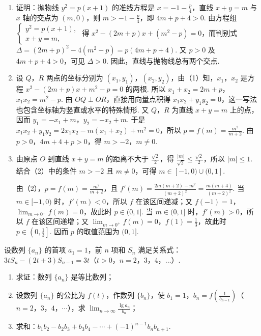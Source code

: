 \begin{solution}

\begin{enumerate}
\item
证明：抛物线 \(y^2=p(x+1)\) 的准线方程是 \(x=-1-\frac{p}{4}\)，直线 \(x+y=m\) 与 \(x\) 轴的交点为 \((m,0)\)，则 \(m>-1-\frac{p}{4}\)，即 \(4m+p+4>0\). 由方程组 \(\begin{cases}
y^2=p(x+1),\\
x+y=m,
\end{cases}\) 得 \(x^2-(2m+p)x+(m^2-p)=0\)，而判别式 \(\Delta=(2m+p)^2-4(m^2-p)=p(4m+p+4)\). 又 \(p>0\) 及 \(4m+p+4>0\)，可见 \(\Delta>0\). 因此，直线与抛物线总有两个交点.

\item 设 \(Q\)，\(R\) 两点的坐标分别为 \((x_1,y_1)\)，\((x_2,y_2)\)，由（1）知，\(x_1\)，\(x_2\) 是方程 \(x^2-(2m+p)x+m^2-p=0\) 的两根. 所以 \(x_1+x_2=2m+p\)，\(x_1x_2=m^2-p\). 由 \(OQ \perp OR\)，直接用向量点积得 \(x_1x_2+y_1y_2=0\)，这一写法也包含坐标轴为竖直或水平的特殊情形. 又 \(Q\)，\(R\) 为直线 \(x+y=m\) 上的点，因而 \(y_1=-x_1+m\)，\(y_2=-x_2+m\). 于是 \(x_1x_2+y_1y_2=2x_1x_2-m(x_1+x_2)+m^2=0\)，所以 \(p=f(m)=\frac{m^2}{m+2}\). 由 \(p>0\)，\(4m+4+p>0\)，得 \(m>-2\)，\(m \neq 0\).

\item 由原点 \(O\) 到直线 \(x+y=m\) 的距离不大于 \(\frac{\sqrt{2}}{2}\)，得 \(\frac{|m|}{\sqrt{2}}\leqslant\frac{\sqrt{2}}{2}\)，所以 \(|m|\leqslant1\). 结合（2）中的条件 \(m>-2\) 且 \(m\neq0\)，可得 \(m\in[-1,0)\cup(0,1]\).

由（2），\(p=f(m)=\frac{m^2}{m+2}\)，且
\(f'(m)=\frac{2m(m+2)-m^2}{(m+2)^2}=\frac{m(m+4)}{(m+2)^2}\). 当 \(m\in[-1,0)\) 时，\(f'(m)<0\)，所以 \(f\) 在该区间递减；又 \(f(-1)=1\)，\(\displaystyle\lim_{m\to0^-}f(m)=0\)，故此时 \(p\in(0,1]\). 当 \(m\in(0,1]\) 时，\(f'(m)>0\)，所以 \(f\) 在该区间递增；又 \(\displaystyle\lim_{m\to0^+}f(m)=0\)，\(f(1)=\frac13\)，故此时 \(p\in\left(0,\frac13\right]\). 因而 \(p\) 的取值范围为 \((0,1]\).
\end{enumerate}
\end{solution}

\begin{problem}
设数列 \(\{a_n\}\) 的首项 \(a_1=1\)，前 \(n\) 项和 \(S_n\) 满足关系式：\(3tS_n-(2t+3)S_{n-1}=3t\)（\(t>0\)，\(n=2\)，\(3\)，\(4\)，\(\dots\)）.
\begin{enumerate}
\item 求证：数列 \(\{a_n\}\) 是等比数列；
\item 设数列 \(\{a_n\}\) 的公比为 \(f(t)\)，作数列 \(\{b_n\}\)，使 \(b_1=1\)，\(b_n=f\left(\frac{1}{b_{n-1}}\right)\)（\(n=2\)，\(3\)，\(4\)，\(\cdots\)），求 \(\displaystyle\lim_{n\to\infty}\frac{\lg a_n}{b_n}\)；
\item 求和：\(b_1b_2-b_2b_3+b_3b_4-\cdots+(-1)^{n-1}b_nb_{n+1}\).
\end{enumerate}
\end{problem}

